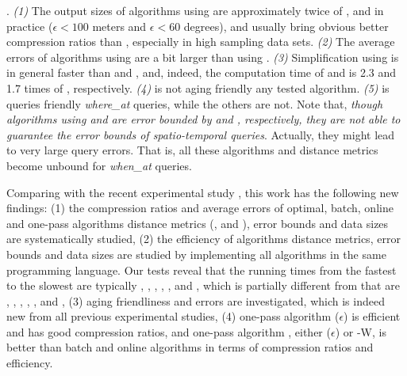 {.
\emph{(1)} The output sizes of algorithms using \sed are approximately twice of \ped, and in practice (\eg $\epsilon <100$ meters and $\epsilon < 60$ degrees), \ped and \sed usually bring obvious better compression ratios than \dad, especially in high sampling data sets.
%
\emph{(2)} The average errors of algorithms using \sed are a bit larger than using \ped.
%
\emph{(3)} Simplification using \dad is in general faster than \ped and \sed, and, indeed, the computation time of \ped and \sed is 2.3 and 1.7 times of \dad, respectively.
%
{\emph{(4)} \dad is not aging friendly \wrt any tested algorithm.}
%
{\emph{(5)} \sed is queries friendly {\wrt \emph{where\_at} queries,}  while the others are not. }
{Note that, \emph{though algorithms using \ped and \dad are error bounded by \ped and \dad, respectively, they are not able to guarantee the error bounds of spatio-temporal queries}. Actually, they might lead to very large query errors.}
{That is, all these algorithms and distance metrics become unbound for \emph{when\_at} queries.}



{Comparing with the recent experimental study \cite{Zhang:Evaluation}, this work has the following new findings:
	(1) the compression ratios and average errors of optimal, batch, online and one-pass algorithms \wrt distance metrics (\ped, \sed and \dad), error bounds and data sizes are systematically studied,
	(2) the efficiency of algorithms \wrt distance metrics, error bounds and data sizes are studied by implementing all algorithms in the same programming language. Our tests reveal that the running times from the fastest to the slowest are typically \intersec, \interval, \operb, \squishe, \dpa, \dagots and \bqsa, which is partially different from \cite{Zhang:Evaluation} that are \intersec, \interval, \dpa, \operb, \dagots, \squishe and \bqsa,
	(3) aging friendliness and errors are investigated, which is indeed new from all previous experimental studies,
	(4) one-pass algorithm \siped ($\epsilon$) is efficient and has good compression ratios, and one-pass algorithm \cised, either \cised($\epsilon$) or \cised-W, is better than batch and online algorithms in terms of compression ratios and efficiency.}



}
